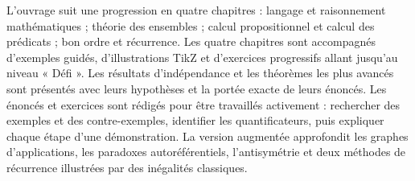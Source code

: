 \documentclass[11pt,a4paper,twoside,openany]{book}
\begin{document}
L'ouvrage suit une progression en quatre chapitres : langage et raisonnement mathématiques ; théorie des ensembles ; calcul propositionnel et calcul des prédicats ; bon ordre et récurrence. Les quatre chapitres sont accompagnés d'exemples guidés, d'illustrations TikZ et d'exercices progressifs allant jusqu'au niveau « Défi ». Les résultats d'indépendance et les théorèmes les plus avancés sont présentés avec leurs hypothèses et la portée exacte de leurs énoncés. Les énoncés et exercices sont rédigés pour être travaillés activement : rechercher des exemples et des contre-exemples, identifier les quantificateurs, puis expliquer chaque étape d'une démonstration. La version augmentée approfondit les graphes d'applications, les paradoxes autoréférentiels, l'antisymétrie et deux méthodes de récurrence illustrées par des inégalités classiques.
\tableofcontents
\mainmatter




\backmatter

\end{document}
